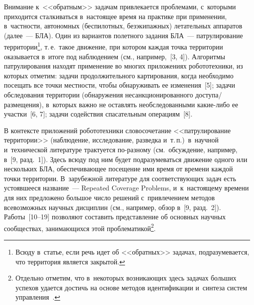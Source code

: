 \begin{multicols}{2}
  Внимание к~<<обратным>> задачам привлекается проб\-ле\-ма\-ми, с~которыми 
приходится сталкиваться в~на\-сто\-ящее время на практике при применении, 
в~част\-ности, автономных (беспилотных, безэкипажных) летательных аппаратов 
(далее~--- БЛА). Один из вариантов полетного задания БЛА~--- 
пат\-ру\-ли\-ро\-ва\-ние территории\footnote[3]{Всюду в~статье, если речь идет об <<обратных>> 
задачах, подразумевается, что территория является закрытой.}, т.\,е.\ такое движение, при 
котором каж\-дая точ\-ка территории оказывается в~итоге под наблюдением 
(см., например,~[3, 4]). Алгоритмы патрулирования находят применение во 
многих приложениях робототехники, из которых отметим: задачи 
продолжительного картирования, когда необходимо посещать все точ\-ки 
мест\-ности, чтобы обнаруживать ее изменения~[5]; задачи обследования 
территории (обнаружения несанкционированного  
до\-сту\-па/раз\-ме\-ще\-ния), в~которых важ\-но не ос\-тав\-лять 
необследованными какие-либо ее участки~[6, 7]; задачи содействия 
спасательным операциям~[8]. 
  
  В контексте приложений робототехники словосочетание <<патрулирование 
территории>> (наблюдение, исследование, разведка и~т.\,п.)\ в~на\-уч\-ной 
и~технической литературе трактуется по-раз\-но\-му (см.\ обсуждение, 
например, в~[9, разд.~1]). Здесь всюду под ним будет подразумеваться 
движение одного или нескольких БЛА, обес\-пе\-чи\-ва\-ющее посещение ими 
время от времени каж\-дой точ\-ки территории. В~за\-ру\-беж\-ной литературе для 
со\-от\-вет\-ст\-ву\-ющих задач есть устоявшееся на\-зва\-ние~--- Repeated Coverage 
Problems, и~к~на\-сто\-яще\-му времени для них пред\-ло\-же\-но большое чис\-ло 
решений с~привлечением методов все\-воз\-мож\-ных научных дисциплин (см., 
например, обзор в~[9, разд.~2]). Работы~[10--19] поз\-во\-ля\-ют со\-ста\-вить 
пред\-став\-ле\-ние об основных научных сообществах, за\-ни\-ма\-ющих\-ся этой 
проб\-ле\-ма\-ти\-кой\footnote{Отдельно отметим, что в~некоторых возникающих здесь задачах 
больших успехов удается достичь на основе методов идентификации и~синтеза систем 
управ\-ле\-ния~\cite{26-kraz}.}. 


\end{multicols}
